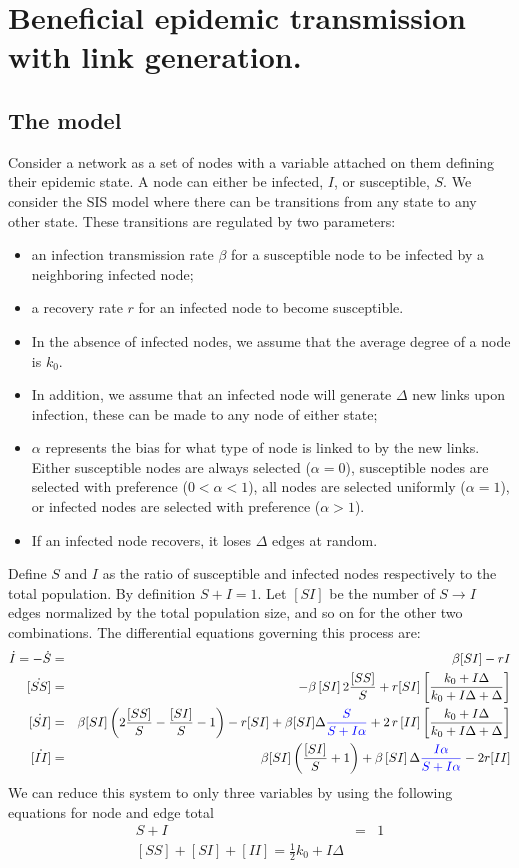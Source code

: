 \documentclass[11pt,final]{article}
\newcommand{\blue}[1]{{\color{blue}{#1}\normalcolor}}
\newcommand{\bea}{\begin{eqnarray}}
\newcommand{\eea}{\end{eqnarray}}
\newcommand{\ra}{\rightarrow}
\newcommand{\f}[2]{\dfrac{#1}{#2}}
\newcommand{\al}{\alpha}
\newcommand{\dl}{\Delta}
\newcommand{\rup}[1]{\left(#1\right)}
\newcommand{\bup}[1]{\left[#1\right]}
\begin{document}
\section*{Beneficial epidemic transmission with link generation.}

\subsection*{The model}
Consider a network as a set of nodes with a variable attached on them defining their epidemic state. A node can either be infected, $I$, or susceptible, $S$. We consider the SIS model where there can be transitions from any state to any other state. These transitions are regulated by two parameters:
\begin{itemize}
\item an infection transmission rate $\beta$ for a susceptible node to be infected by a neighboring infected node; 
\item a recovery rate $r$ for an infected node to become susceptible.
\item In the absence of infected nodes, we assume that the average degree of a node is $k_0$.
\item In addition, we assume that an infected node will generate $\Delta$ new links upon infection, these can be made to any node of either state;
\item $\al$ represents the bias for what type of node is linked to by the new links. Either susceptible nodes are always selected ($\al=0$), susceptible
    nodes are selected with preference ($0<\al<1$), all nodes are selected uniformly ($\al=1$), or infected nodes are selected with preference ($\al>1$).
\item If an infected node recovers, it loses $\Delta$ edges at random.
\end{itemize}

Define $S$ and $I$ as the ratio of susceptible and infected nodes respectively to the total population.
By definition $S+I=1$. Let $[SI]$ be the number of $S \ra I$ edges normalized by the total population size,
and so on for the other two combinations.
The differential equations governing this process are:
\bea
\dot{I}=-\dot{S}&=& \beta [SI] -rI \\
\dot{[SS]}&=& -\beta \,[SI]\, 2\f{[SS]}{S} +r [SI] \bup{\f{k_{0}+I \Delta}{k_{0}+I \Delta +\Delta}} \\
\dot{[SI]}&=& \beta[SI] \rup{ 2\f{[SS]}{S} -\f{[SI]}{S}-1} -r[SI] +\beta[SI]\dl \blue{\f{S}{S+I\al} }+2\,r\,[II]  \bup{\f{k_{0}+I \Delta}{k_{0}+I \Delta +\Delta}} \\
\dot{[II]}&=& \beta[SI] \rup{\f{[SI]}{S} +1} +\beta\,[SI]\, \dl  \blue{\f{I\al}{S+I\al}} -2r [II]
\eea
We can reduce this system to only three variables by using the following equations for node and edge total
\bea \label{eq:closure}
S + I &=& 1\\
[SS]+[SI]+[II] = \tfrac12 k_0 + I\dl
\eea
\end{document}
